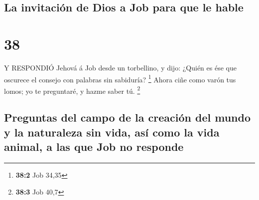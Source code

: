 \hypertarget{la-invitaciuxf3n-de-dios-a-job-para-que-le-hable}{%
\subsection{La invitación de Dios a Job para que le
hable}\label{la-invitaciuxf3n-de-dios-a-job-para-que-le-hable}}

\hypertarget{section-37}{%
\section{38}\label{section-37}}

 Y RESPONDIÓ Jehová á Job desde un torbellino, y dijo:
 ¿Quién es ése que oscurece el consejo con palabras sin
sabiduría? \footnote{\textbf{38:2} Job 34,35}  Ahora ciñe
como varón tus lomos; yo te preguntaré, y hazme saber tú. \footnote{\textbf{38:3}
  Job 40,7}

\hypertarget{preguntas-del-campo-de-la-creaciuxf3n-del-mundo-y-la-naturaleza-sin-vida-asuxed-como-la-vida-animal-a-las-que-job-no-responde}{%
\subsection{Preguntas del campo de la creación del mundo y la naturaleza
sin vida, así como la vida animal, a las que Job no
responde}\label{preguntas-del-campo-de-la-creaciuxf3n-del-mundo-y-la-naturaleza-sin-vida-asuxed-como-la-vida-animal-a-las-que-job-no-responde}}

